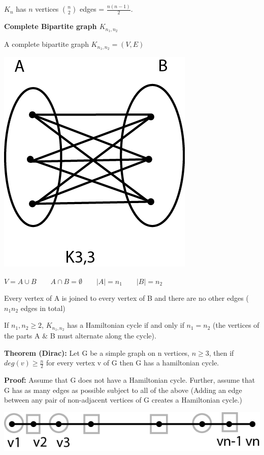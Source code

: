 \documentclass[9pt, letterpaper, oneside]{article}
\begin{document}
$K_n$ has $n$ vertices ${n \choose 2}$ edges = $\frac{n(n-1)}{2}$.

\textbf{Complete Bipartite graph $K_{n_1, n_2}$}

A complete bipartite graph $K_{n_1, n_2} = (V,E)$

\includegraphics{fig14.png}

$V = A \cup B \qquad A \cap B = \emptyset \qquad |A| = n_1 \qquad |B| = n_2$ 

Every vertex of A is joined to every vertex of B and there are no other edges ($n_1 n_2$ edges in total)

If $n_1, n_2 \geq 2$, $K_{n_1,n_2}$ has a Hamiltonian cycle if and only if $n_1 = n_2$ (the vertices of the parts A $\&$ B must alternate along the cycle). 


\textbf{Theorem (Dirac):} Let G be a simple graph on n vertices, $n \geq 3$, then if $deg(v) \geq \frac{n}{2}$ for every vertex v of G then G has a hamiltonian cycle.

\textbf{Proof:} Assume that G does not have a Hamiltonian cycle. Further, assume that G has as many edges as possible subject to all of the above (Adding an edge between any pair of non-adjacent vertices of G creates a Hamiltonian cycle.)

\includegraphics{fig15.png}
\end{document}
